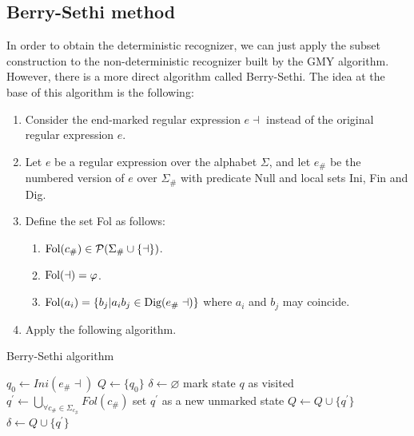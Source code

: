 \subsection*{Berry-Sethi method}
In order to obtain the deterministic recognizer, we can just apply the subset construction to the non-deterministic recognizer built by the GMY algorithm. 
However, there is a more direct algorithm called Berry-Sethi.
The idea at the base of this algorithm is the following: 
\begin{enumerate}
    \item Consider the end-marked regular expression $e \dashv$ instead of the original regular expression $e$.
    \item Let $e$ be a regular expression over the alphabet $\Sigma$, and let $e_{\#}$ be the numbered version of $e$ over $\Sigma_{\#}$ with predicate Null and local sets Ini, Fin and Dig. 
    \item Define the set Fol as follows: 
        \begin{enumerate}
            \item $\textnormal{Fol}(c_{\#}) \in \mathcal{P} (\Sigma_{\#} \cup \{\dashv\})$. 
            \item $\textnormal{Fol}(\dashv)=\varphi$.
            \item $\textnormal{Fol}(a_i)=\{b_j|a_ib_j \in \textnormal{Dig}(e_{\#}\dashv)\}$ where $a_i$ and $b_j$ may coincide. 
        \end{enumerate} 
    \item Apply the following algorithm. 
\end{enumerate}
\begin{algorithm}[H]
    \caption{Berry-Sethi algorithm}
        \begin{algorithmic}[1]
            \State $q_0 \leftarrow Ini(e_{\#} \dashv)$
            \State $Q \leftarrow \{q_0\}$
            \State $\delta \leftarrow \varnothing$
                \State mark state $q$ as visited
                    \State $q^{'} \leftarrow \bigcup_{\forall c_{\#} \in \Sigma_{c_{\#}}}Fol(c_{\#})$
                            \State set $q^{'}$ as a new unmarked state
                            \State $Q \leftarrow Q \cup \{q^{'}\}$
                        \EndIf
                        \State $\delta \leftarrow Q \cup \{q^{'}\}$
                    \EndIf
                \EndFor
            \EndWhile
        \end{algorithmic}
\end{algorithm}
